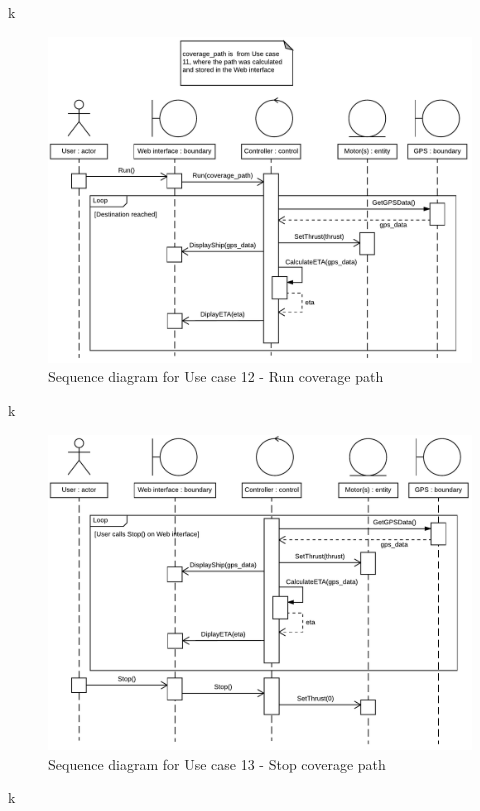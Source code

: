 k

\begin{figure}[H]
	\centering
	\includegraphics[width=1\linewidth]{Images/System_architecture/Use_case_12_SD}
	\caption{Sequence diagram for Use case 12 - Run coverage path}
\end{figure}

k

\begin{figure}[H]
	\centering
	\includegraphics[width=1\linewidth]{Images/System_architecture/Use_case_13_SD}
	\caption{Sequence diagram for Use case 13 - Stop coverage path}
\end{figure}

k

